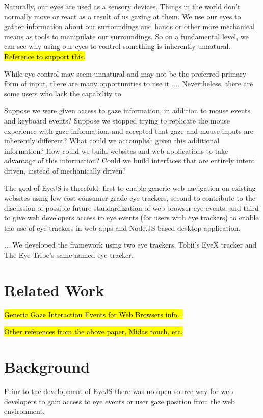 \documentclass{sigchi}
\begin{document}
Naturally, our eyes are used as a sensory devices. Things in the 
world don't normally move or react as a result of us gazing at them. 
We use our eyes to gather information about our surroundings and 
hands or other more mechanical means as tools to manipulate our 
surroundings. So on a fundamental level, we can see why using 
our eyes to control something is inherently unnatural. \hl{Reference 
to support this.}

While eye control may seem unnatural and may not be the preferred 
primary form of input, there are many opportunities to use it 
.... Nevertheless, there are some users who lack the capability to 

Suppose we were given access to gaze information, in addition to mouse events and keyboard events? Suppose we stopped trying to replicate the mouse experience with gaze information, and accepted that gaze and mouse inputs are inherently different? What could we accomplish given this additional information? How could we build websites and web applications to take advantage of this information? Could we build interfaces that are entirely intent driven, instead of mechanically driven?

The goal of EyeJS is threefold: first to enable generic web navigation 
on existing websites using low-cost consumer grade eye trackers,
second to contribute to the discussion of possible future 
standardization of web browser eye events, and third to give web 
developers access to eye events (for users with eye trackers) to enable
the use of eye trackers in web apps and Node.JS based desktop 
application.

... We developed the framework using two eye trackers, Tobii's EyeX
tracker and The Eye Tribe's same-named eye tracker.



\section{Related Work}

\hl{Generic Gaze Interaction Events for Web Browsers info...}

\hl{Other references from the above paper, Midas touch, etc.}



\section{Background}
Prior to the development of EyeJS there was no open-source way for 
web developers to gain access to eye events or user gaze position from
the web environment.
\end{document}

